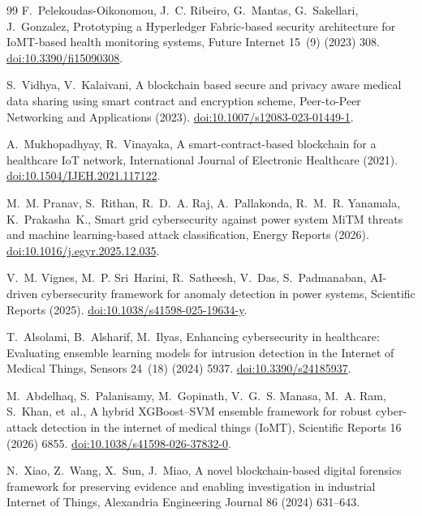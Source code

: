 \documentclass[preprint,12pt]{elsarticle}
\begin{document}
\begin{thebibliography}{99}
 F.~Pelekoudas-Oikonomou, J.~C. Ribeiro, G.~Mantas, G.~Sakellari, J.~Gonzalez, Prototyping a Hyperledger Fabric-based security architecture for IoMT-based health monitoring systems, Future Internet 15~(9) (2023) 308. \href{https://doi.org/10.3390/fi15090308}{doi:10.3390/fi15090308}.

 S.~Vidhya, V.~Kalaivani, A blockchain based secure and privacy aware medical data sharing using smart contract and encryption scheme, Peer-to-Peer Networking and Applications (2023). \href{https://doi.org/10.1007/s12083-023-01449-1}{doi:10.1007/s12083-023-01449-1}. %

 A.~Mukhopadhyay, R.~Vinayaka, A smart-contract-based blockchain for a healthcare IoT network, International Journal of Electronic Healthcare (2021). \href{https://doi.org/10.1504/IJEH.2021.117122}{doi:10.1504/IJEH.2021.117122}. %

 M.~M. Pranav, S.~Rithan, R.~D.~A. Raj, A.~Pallakonda, R.~M.~R. Yanamala, K.~Prakasha~K., Smart grid cybersecurity against power system MiTM threats and machine learning-based attack classification, Energy Reports (2026). \href{https://doi.org/10.1016/j.egyr.2025.12.035}{doi:10.1016/j.egyr.2025.12.035}. %

 V.~M. Vignes, M.~P. Sri~Harini, R.~Satheesh, V.~Das, S.~Padmanaban, AI-driven cybersecurity framework for anomaly detection in power systems, Scientific Reports (2025). \href{https://doi.org/10.1038/s41598-025-19634-y}{doi:10.1038/s41598-025-19634-y}. %

 T.~Alsolami, B.~Alsharif, M.~Ilyas, Enhancing cybersecurity in healthcare: Evaluating ensemble learning models for intrusion detection in the Internet of Medical Things, Sensors 24~(18) (2024) 5937. \href{https://doi.org/10.3390/s24185937}{doi:10.3390/s24185937}.

 M.~Abdelhaq, S.~Palanisamy, M.~Gopinath, V.~G.~S. Manasa, M.~A. Ram, S.~Khan, et~al., A hybrid XGBoost--SVM ensemble framework for robust cyber-attack detection in the internet of medical things (IoMT), Scientific Reports 16 (2026) 6855. \href{https://doi.org/10.1038/s41598-026-37832-0}{doi:10.1038/s41598-026-37832-0}. %

 N.~Xiao, Z.~Wang, X.~Sun, J.~Miao, A novel blockchain-based digital forensics framework for preserving evidence and enabling investigation in industrial Internet of Things, Alexandria Engineering Journal 86 (2024) 631--643. %

\end{thebibliography}
\end{document}
